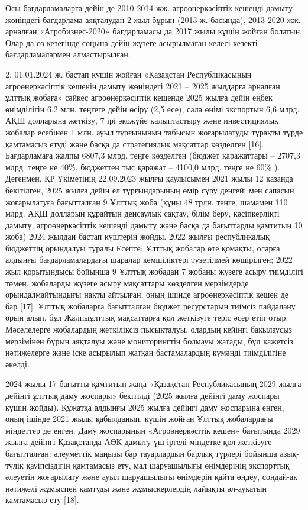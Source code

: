 {{Осы бағдарламаларға дейін де 2010-2014 жж. агроөнеркәсіптік кешенді
дамыту жөніндегі бағдарлама аяқталудан 2 жыл бұрын (2013 ж. басында),
2013-2020 жж. арналған «Агробизнес-2020» бағдарламасы да 2017 жылы күшін
жойған болатын. Олар да өз кезегінде соңына дейін жүзеге асырылмаған
келесі кезекті бағдарламалармен алмастырылған.

2. 01.01.2024 ж. бастап күшін жойған «Қазақстан Республикасының
агроөнеркәсіптік кешенін дамыту жөніндегі 2021 -- 2025 жылдарға арналған
ұлттық жобаға» сәйкес агроөнеркәсіптік кешенде 2025 жылға дейін еңбек
өнімділігін 6,2 млн. теңгеге дейін өсіру (2,5 есе), сала өнімі экспортын
6,6 млрд. АҚШ долларына жеткізу, 7 ірі экожүйе қалыптастыру және
инвестициялық жобалар есебінен 1 млн. ауыл тұрғынының табысын
жоғарылатуды тұрақты түрде қамтамасыз етуді және басқа да стратегиялық
мақсаттар көзделген {[}16{]}. Бағдарламаға жалпы 6807,3 млрд. теңге
көзделген (бюджет қаражаттары -- 2707,3 млрд. теңге не 40\%, бюджеттен
тыс қаражат -- 4100,0 млрд. теңге не 60\% ). Дегенмен, ҚР Үкіметінің
22.09.2023 жылғы қаулысымен 2021 жылы 12 қазанда бекітілген, 2025 жылға
дейін ел тұрғындарының өмір сүру деңгейі мен сапасын жоғарылатуға
бағытталған 9 Ұлттық жоба (құны 48 трлн. теңге, шамамен 110 млрд. АҚШ
долларын құрайтын денсаулық сақтау, білім беру, кәсіпкерлікті дамыту,
агроөнеркәсіптік кешенді дамыту және басқа да бағыттарды қамтитын 10
жоба) 2024 жылдан бастап күштерін жойды. 2022 жылғы республикалық
бюджеттің орындалуы туралы Есепте: Ұлттық жобалар өте қомақты, оларға
алдыңғы бағдарламалардағы шаралар кемшіліктері түзетілмей көшірілген;
2022 жыл қорытындысы бойынша 9 Ұлттық жобадан 7 жобаны жүзеге асыру
тиімділігі төмен, жобаларды жүзеге асыру мақсаттары көзделген
мерзімдерде орындалмайтындығы нақты айтылған, оның ішінде
агроөнеркәсіптік кешен де бар {[}17{]}. Ұлттық жобаларға бағытталған
бюджет ресурстарын тиімсіз пайдалану орын алып, бұл Жалпыұлттық
мақсаттарға қол жеткізуге теріс әсер етіп отыр. Мәселелерге жобалардың
жеткіліксіз пысықталуы, олардың кейінгі бақылаусыз мерзімінен бұрын
аяқталуы және мониторингтің болмауы жатады, бұл қажетсіз нәтижелерге
және іске асырылып жатқан бастамалардың күмәнді тиімділігіне әкелді.

2024 жылы 17 бағытты қамтитын жаңа «Қазақстан Республикасының 2029 жылға
дейінгі ұлттық даму жоспары» бекітілді (2025 жылға дейінгі даму жоспары
күшін жойды). Құжатқа алдыңғы 2025 жылға дейінгі даму жоспарына енген,
оның ішінде 2021 жылы қабылданып, күшін жойған Ұлттық жобалардағы
міндеттер де енген. Даму жоспарының «Агроөнеркәсітік кешен» бағытында
2029 жылға дейінгі Қазақстанда АӨК дамыту үш іргелі міндетке қол
жеткізуге бағытталған: әлеуметтік маңызы бар тауарлардың барлық түрлері
бойынша азық-түлік қауіпсіздігін қамтамасыз ету, мал шаруашылығы
өнімдерінің экспорттық әлеуетін жоғарылату және ауыл шаруашылығы
өнімдерін қайта өңдеу, сондай-ақ нәтижелі жұмыспен қамтуды және
жұмыскерлердің лайықты әл-ауқатын қамтамасыз ету {[}18{]}.

}}
